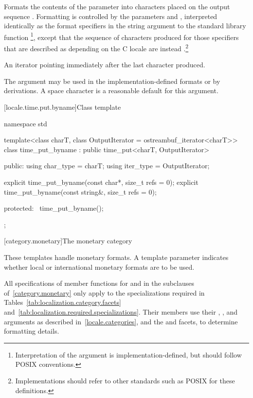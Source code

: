 \begin{itemdescr}
\pnum
\effects
Formats the contents of the parameter 
into characters placed on the output sequence .
Formatting is controlled by the parameters  and ,
interpreted identically as the format specifiers in the string
argument to the standard library function
%
\footnote{Interpretation of the 
argument is implementation-defined, but should follow POSIX
conventions.},
except that the sequence of characters produced for those specifiers
that are described as depending on the C locale are instead .\footnote{Implementations should refer to other standards
such as POSIX
for these definitions.}

\pnum
\returns
An iterator pointing immediately after the last character produced.
\begin{note}
The  argument may be used in the implementation-defined
formats or by derivations. A space character is a reasonable
default for this argument.
\end{note}
\end{itemdescr}

[locale.time.put.byname]{Class template }

%
\begin{codeblock}
namespace std {
  template<class charT, class OutputIterator = ostreambuf_iterator<charT>>
    class time_put_byname : public time_put<charT, OutputIterator> {
    public:
      using char_type = charT;
      using iter_type = OutputIterator;

      explicit time_put_byname(const char*, size_t refs = 0);
      explicit time_put_byname(const string&, size_t refs = 0);

    protected:
      ~time_put_byname();
    };
}
\end{codeblock}

[category.monetary]{The monetary category}

\pnum
These templates handle monetary formats.
A template parameter indicates whether
local or international monetary formats are to be used.

\pnum
All specifications of member functions for
and
in the subclauses of~\ref{category.monetary} only apply to the
specializations required in Tables~\ref{tab:localization.category.facets}
and~\ref{tab:localization.required.specializations}.
Their members use their
,
,
and
arguments as described in~\ref{locale.categories}, and the
and
facets, to determine formatting details.


